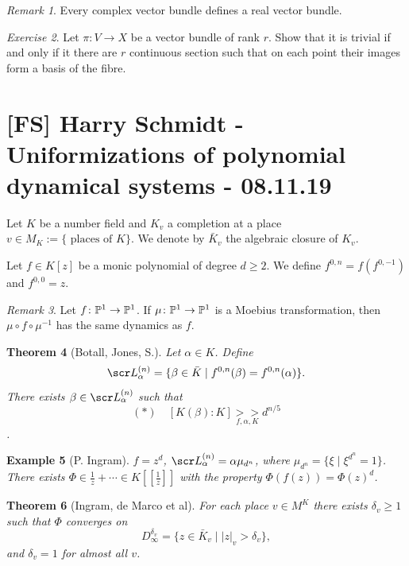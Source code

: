 \documentclass[A4paper, british, reqno]{amsart}
\theoremstyle{darkgreentheorem}
\newtheorem{thm}{Theorem}[section]
\theoremstyle{darkbluedefinition}
\theoremstyle{darkredexample}
\newtheorem{exa}[thm]{Example}
\theoremstyle{remark}
\newtheorem{rem}[thm]{Remark}
\newtheorem{exe}[thm]{Exercise}
\newcommand{\1}{\mathbbm{1}}
\begin{document}
\begin{rem}
    Every complex vector bundle defines a real vector bundle.
\end{rem}

\begin{exe}
    Let $\pi\colon V\to X$ be a vector bundle of rank $r$.
    Show that it is trivial if and only if it there are $r$ continuous section such that on each point their images form a basis of the fibre.
\end{exe}

\section{[FS] Harry Schmidt - Uniformizations of polynomial dynamical systems - 08.11.19}

Let $K$ be a number field and $K_{v}$ a completion at a place $v\in M_{K}:=\{ \text{ places of }K\}$.
We denote by $\bar{K}_{v}$ the algebraic closure of $K_{v}$.

Let $f\in K[z]$ be a monic polynomial of degree $d\geqslant 2$.
We define $f^{0,n}=f(f^{0,-1})$ and $f^{0,0}=z$.

\begin{rem}
    Let $f\colon \P^{1}\to \P^{1}$.
    If $\mu\colon \P^{1}\to \P^{1}$ is a Moebius transformation, then $\mu\circ f\circ \mu^{-1}$ has the same dynamics as $f$.
\end{rem}

\begin{thm}[Botall, Jones, S.]
    Let $\alpha\in K$.
    Define
    \[ \L_{\alpha}^{(n)}=\{ \beta\in \bar{K}\mid f^{0,n}(\beta)=f^{0,n}(\alpha)\}. \]
    There exists $\beta\in \L_{\alpha}^{(n)}$ such that
    \[ (*)\quad [K(\beta):K]\underset{f,\alpha,K}{>>}d^{n/5}\].
\end{thm}

\begin{exa}[P. Ingram]
    $f=z^{d}$, $\L_{\alpha}^{(n)}=\alpha\mu_{d^{n}}$, where $\mu_{d^{n}}=\{ \xi \mid \xi^{d^{n}}=1\}$.
    There exists $\Phi\in \frac{1}{z}+\cdots \in K[[\frac{1}{z}]]$ with the property $\Phi(f(z))=\Phi(z)^{d}$.
\end{exa}

\begin{thm}[Ingram, de Marco et al]
    For each place $v\in M^{K}$ there exists $\delta_{v}\geqslant 1$ such that $\Phi$ converges on
    \[ D_{\infty}^{\delta_{v}}=\{ z\in \bar{K}_{v}\mid |z|_{v}>\delta_{v}\},\]
    and $\delta_{v}=1$ for almost all $v$.
\end{thm}
\end{document}
